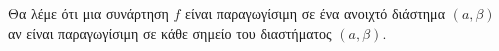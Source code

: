 Θα λέμε ότι μια συνάρτηση $ f $ είναι παραγωγίσιμη σε ένα ανοιχτό διάστημα $ (a,\beta) $ αν είναι παραγωγίσιμη σε κάθε σημείο του διαστήματος $ (a,\beta) $.
